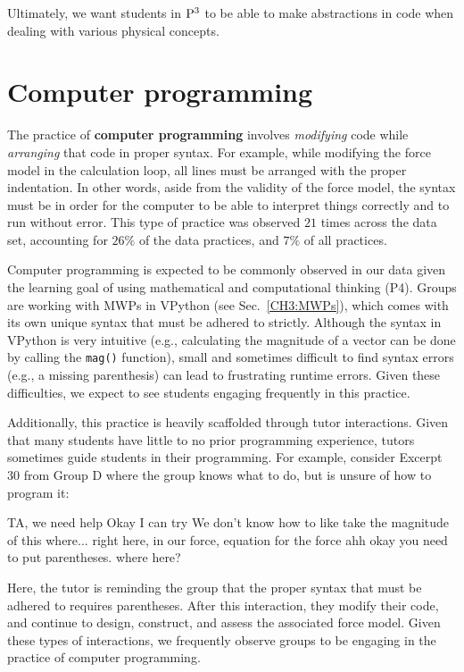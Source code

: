 \documentclass{msuphddissertation}
\begin{document}
\begin{doublespace}
\begin{appendices}
Ultimately, we want students in ${\rm P}^{3}$ to be able to make abstractions in code when dealing with various physical concepts.

\section*{Computer programming}

The practice of \textbf{computer programming} involves \textit{modifying} code while \textit{arranging} that code in proper syntax.  For example, while modifying the force model in the calculation loop, all lines must be arranged with the proper indentation.  In other words, aside from the validity of the force model, the syntax must be in order for the computer to be able to interpret things correctly and to run without error.  This type of practice was observed $21$ times across the data set, accounting for $26\%$ of the data practices, and $7\%$ of all practices.

Computer programming is expected to be commonly observed in our data given the learning goal of using mathematical and computational thinking (P4).  Groups are working with MWPs in VPython (see Sec.~\ref{CH3:MWPs}), which comes with its own unique syntax that must be adhered to strictly.  Although the syntax in VPython is very intuitive (e.g., calculating the magnitude of a vector can be done by calling the \texttt{mag()} function), small and sometimes difficult to find syntax errors (e.g., a missing parenthesis) can lead to frustrating runtime errors.  Given these difficulties, we expect to see students engaging frequently in this practice.

Additionally, this practice is heavily scaffolded through tutor interactions.  Given that many students have little to no prior programming experience, tutors sometimes guide students in their programming.  For example, consider Excerpt 30 from Group D where the group knows what to do, but is unsure of how to program it: \begin{description}
\SB TA, we need help
\TA Okay I can try
\SB We don't know how to like take the magnitude of this
\TA where...
\SB right here, in our force, equation for the force
\TA ahh okay you need to put parentheses.
\SB where here?
\end{description}  Here, the tutor is reminding the group that the proper syntax that must be adhered to requires parentheses.  After this interaction, they modify their code, and continue to design, construct, and assess the associated force model.  Given these types of interactions, we frequently observe groups to be engaging in the practice of computer programming.


\end{appendices}
\end{doublespace}
\end{document}
